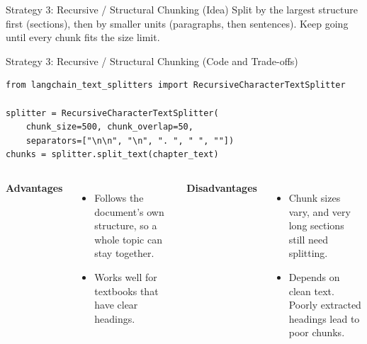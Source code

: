 \documentclass[aspectratio=169,10pt]{beamer}
\begin{document}
\begin{frame}[t]{Strategy 3: Recursive / Structural Chunking (Idea)}
\small
Split by the largest structure first (sections), then by smaller units (paragraphs, then sentences). Keep going until every chunk fits the size limit.
\vspace{14pt}
\begin{center}
\end{center}
\end{frame}

\begin{frame}[t,fragile]{Strategy 3: Recursive / Structural Chunking (Code and Trade-offs)}
\small
\begin{lstlisting}
from langchain_text_splitters import RecursiveCharacterTextSplitter

splitter = RecursiveCharacterTextSplitter(
    chunk_size=500, chunk_overlap=50,
    separators=["\n\n", "\n", ". ", " ", ""])
chunks = splitter.split_text(chapter_text)
\end{lstlisting}
\vspace{6pt}
\begin{columns}[T]
\textbf{Advantages}
\begin{itemize}
  \item Follows the document's own structure, so a whole topic can stay together.
  \item Works well for textbooks that have clear headings.
\end{itemize}
\textbf{Disadvantages}
\begin{itemize}
  \item Chunk sizes vary, and very long sections still need splitting.
  \item Depends on clean text. Poorly extracted headings lead to poor chunks.
\end{itemize}
\end{columns}
\end{frame}
\end{document}
